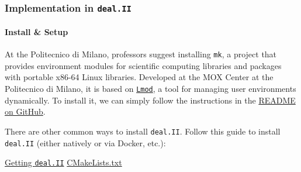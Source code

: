\subsubsection{Implementation in \texttt{deal.II}}

\paragraph{Install \& Setup}

At the Politecnico di Milano, professors suggest installing \texttt{mk}, a project that provides environment modules for scientific computing libraries and packages with portable x86-64 Linux libraries. Developed at the MOX Center at the Politecnico di Milano, it is based on \href{https://lmod.readthedocs.io/en/latest/index.html}{\texttt{Lmod}}, a tool for managing user environments dynamically. To install it, we can simply follow the instructions in the \href{https://github.com/pcafrica/mk}{README on GitHub}.

\highspace
There are other common ways to install \texttt{deal.II}. Follow this guide to install \texttt{deal.II} (either natively or via Docker, etc.):
\begin{center}
    \href{https://github.com/dealii/dealii/wiki/Getting-deal.II}{Getting \texttt{deal.II}} \hspace{.5em}
    \hspace{2em}
    \href{https://gist.github.com/AndreVale69/f04f312da68d16c253f46493ae7eaf24}{ CMakeLists.txt}
    \hspace{.5em}
\end{center}

